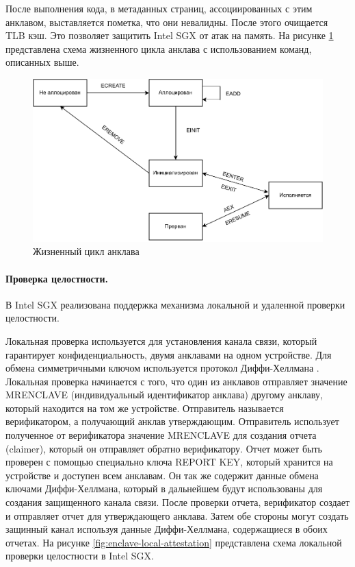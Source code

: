 После выполнения кода, в метаданных страниц, ассоциированных с этим анклавом, выставляется пометка, что они невалидны. После этого очищается TLB кэш. Это позволяет защитить Intel SGX от атак на память. На рисунке \ref{fig:enclave-life} представлена схема жизненного цикла анклава с использованием команд, описанных выше.

\begin{figure}[h]
	\centering
	\includegraphics[width=\textwidth]{img/enclave-life-cycle.pdf}
	\caption{Жизненный цикл анклава}
	\label{fig:enclave-life}
\end{figure}

\paragraph{Проверка целостности.}

В Intel SGX реализована поддержка механизма локальной и удаленной  проверки целостности. 

Локальная проверка используется для установления канала связи, который гарантирует конфиденциальность, двумя анклавами на одном устройстве. Для обмена симметричными ключом используется протокол  Диффи-Хеллмана \cite{dh-ke}. Локальная проверка начинается с того, что один из анклавов отправляет значение MRENCLAVE (индивидуальный идентификатор анклава) другому анклаву, который находится на том же устройстве. Отправитель называется верификатором, а получающий анклав утверждающим. Отправитель использует полученное от верификатора значение MRENCLAVE для создания отчета (claimer), который он отправляет обратно верификатору. Отчет может быть проверен с помощью специально ключа REPORT KEY, который хранится на устройстве и доступен всем анклавам. Он так же содержит данные обмена ключами Диффи-Хеллмана, который в дальнейшем будут использованы для создания защищенного канала связи. После проверки отчета, верификатор создает и отправляет отчет для утверждающего анклава. Затем обе стороны могут создать защинный канал используя данные Диффи-Хеллмана, содержащиеся в обоих отчетах. На рисунке \ref{fig:enclave-local-attestation} представлена схема локальной проверки целостности в Intel SGX.

